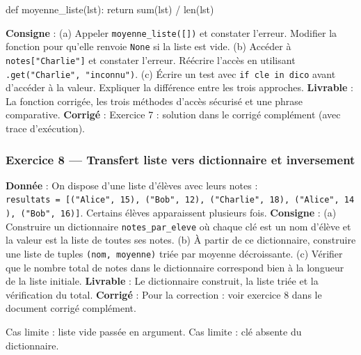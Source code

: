\begin{python}
def moyenne_liste(lst):
    return sum(lst) / len(lst)
\end{python}

\textbf{Consigne} : (a) Appeler \texttt{moyenne\_liste({[}{]})} et
constater l'erreur. Modifier la fonction pour qu'elle renvoie
\texttt{None} si la liste est vide. (b) Accéder à
\texttt{notes{[}"Charlie"{]}} et constater l'erreur. Réécrire l'accès en
utilisant \texttt{.get("Charlie",\ "inconnu")}. (c) Écrire un test avec
\texttt{if\ cle\ in\ dico} avant d'accéder à la valeur. Expliquer la
différence entre les trois approches. \textbf{Livrable} : La fonction
corrigée, les trois méthodes d'accès sécurisé et une phrase comparative.
\textbf{Corrigé} : Exercice 7 : solution dans le corrigé complément
(avec trace d'exécution).

\subsubsection{Exercice 8 — Transfert liste vers dictionnaire et inversement}

\textbf{Donnée} : On dispose d'une liste d'élèves avec leurs notes :
\texttt{resultats\ =\ {[}("Alice",\ 15),\ ("Bob",\ 12),\ ("Charlie",\ 18),\ ("Alice",\ 14),\ ("Bob",\ 16){]}}.
Certains élèves apparaissent plusieurs fois. \textbf{Consigne} : (a)
Construire un dictionnaire \texttt{notes\_par\_eleve} où chaque clé est
un nom d'élève et la valeur est la liste de toutes ses notes. (b) À
partir de ce dictionnaire, construire une liste de tuples
\texttt{(nom,\ moyenne)} triée par moyenne décroissante. (c) Vérifier
que le nombre total de notes dans le dictionnaire correspond bien à la
longueur de la liste initiale. \textbf{Livrable} : Le dictionnaire
construit, la liste triée et la vérification du total. \textbf{Corrigé}
: Pour la correction : voir exercice 8 dans le document corrigé
complément.

Cas limite : liste vide passée en argument. Cas limite : clé absente du
dictionnaire.

